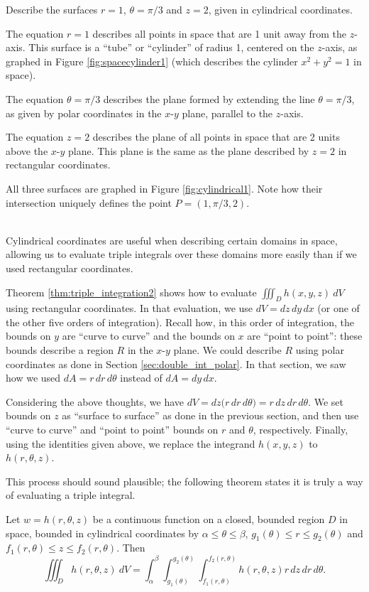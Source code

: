 %
{Describe the surfaces $r=1$, $\theta = \pi/3$ and $z=2$, given in cylindrical coordinates.
}
{The equation $r=1$ describes all points in space that are 1 unit away from the $z$-axis. This surface is a ``tube'' or ``cylinder'' of radius 1, centered on the $z$-axis, as graphed in Figure \ref{fig:spacecylinder1} (which describes the cylinder $x^2+y^2=1$ in space). 

The equation $\theta=\pi/3$ describes the plane formed by extending the line $\theta=\pi/3$, as given by polar coordinates in the $x$-$y$ plane, parallel to the $z$-axis.

The equation $z=2$ describes the plane of all points in space that are 2 units above the $x$-$y$ plane. This plane is the same as the plane described by $z=2$ in rectangular coordinates.

All three surfaces are graphed in Figure \ref{fig:cylindrical1}. Note how their intersection uniquely defines the point $P=(1,\pi/3,2)$.
}\\

Cylindrical coordinates are useful when describing certain domains in space, allowing us to evaluate triple integrals over these domains more easily than if we used rectangular coordinates.

Theorem \ref{thm:triple_integration2} shows how to evaluate $\iiint_Dh(x,y,z)\ dV$ using rectangular coordinates. In that evaluation, we use $dV = dz\,dy\,dx$ (or one of the other five orders of integration). Recall how, in this order of integration, the bounds on $y$ are ``curve to curve'' and the bounds on $x$ are ``point to point'': these bounds describe a region $R$ in the $x$-$y$ plane. We could describe $R$ using polar coordinates as done in Section \ref{sec:double_int_polar}. In that section, we saw how we used $dA = r\,dr\,d\theta$ instead of $dA = dy\,dx$. 

Considering the above thoughts, we have $dV = dz\big(r\,dr\,d\theta\big) = r\,dz\,dr\,d\theta$. We set bounds on $z$ as ``surface to surface'' as done in the previous section, and then use ``curve to curve'' and ``point to point'' bounds on $r$ and $\theta$, respectively. Finally, using the identities given above, we replace the integrand $h(x,y,z)$ to $h(r,\theta,z)$.

This process should sound plausible; the following theorem states it is truly a way of evaluating a triple integral.

{%
Let $w=h(r,\theta,z)$ be a continuous function on a closed, bounded region $D$ in space, bounded in cylindrical coordinates by $\alpha \leq \theta \leq \beta$, $g_1(\theta)\leq r \leq g_2(\theta)$ and $f_1(r,\theta) \leq z \leq f_2(r,\theta)$. Then 
$$\iiint_D h(r,\theta,z)\ dV = \int_\alpha^\beta\int_{g_1(\theta)}^{g_2(\theta)}\int_{f_1(r,\theta)}^{f_2(r,\theta)}h(r,\theta,z) r\,dz\,dr\,d\theta.$$
}

